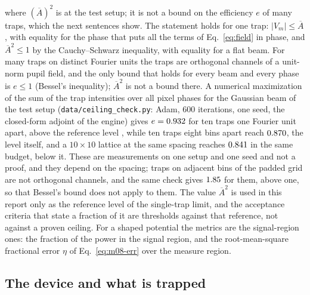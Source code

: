 where $(\overline A)^2$ is  at the test setup; it is not a bound on the efficiency $e$ of many traps, which the next sentences show. The statement holds for one trap: $|V_m|\le\overline A$, with equality for the phase that puts all the terms of Eq.~\eqref{eq:field} in phase, and $\overline A^2\le1$ by the Cauchy--Schwarz inequality, with equality for a flat beam. For many traps on distinct Fourier units the traps are orthogonal channels of a unit-norm pupil field, and the only bound that holds for every beam and every phase is $e\le1$ (Bessel's inequality); $\overline A^2$ is not a bound there. A numerical maximization of the sum of the trap intensities over all pixel phases for the Gaussian beam of the test setup (\texttt{data/ceiling\_check.py}: Adam, 600 iterations, one seed, the closed-form adjoint of the engine) gives $e=0.932$ for ten traps one Fourier unit apart, above the reference level , while ten traps eight bins apart reach $0.870$, the level itself, and a $10\times10$ lattice at the same spacing reaches $0.841$ in the same budget, below it. These are measurements on one setup and one seed and not a proof, and they depend on the spacing; traps on adjacent bins of the padded grid are not orthogonal channels, and the same check gives $1.85$ for them, above one, so that Bessel's bound does not apply to them. The value $\overline A^2$ is used in this report only as the reference level of the single-trap limit, and the acceptance criteria that state a fraction of it are thresholds against that reference, not against a proven ceiling. For a shaped potential the metrics are the signal-region ones: the fraction of the power in the signal region, and the root-mean-square fractional error $\eta$ of Eq.~\eqref{eq:m08-err} over the measure region.

\subsection{The device and what is trapped}\label{sec:problem-trap}

